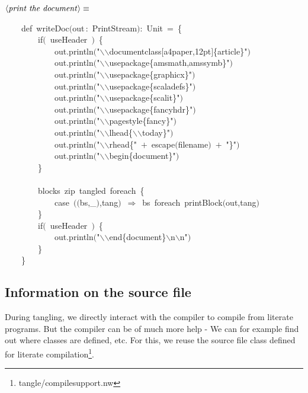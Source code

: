 \documentclass[a4paper,12pt]{article}
\begin{document}
$\left<\mbox{\emph{print the document}}\right>\equiv$
\begin{program}~~~~{\vem def}~writeDoc$($out\,{\rm :}~PrintStream$)${\rm :}~Unit~=~{\small\{}
\\~~~~~~~~{\vem if}$($~useHeader~$)$~{\small\{}
\\~~~~~~~~~~~~out.println$($"$\backslash$$\backslash$documentclass$[$a4paper,12pt$]${\small\{}article{\small\}}"$)$
\\~~~~~~~~~~~~out.println$($"$\backslash$$\backslash$usepackage{\small\{}amsmath,amssymb{\small\}}"$)$
\\~~~~~~~~~~~~out.println$($"$\backslash$$\backslash$usepackage{\small\{}graphicx{\small\}}"$)$
\\~~~~~~~~~~~~out.println$($"$\backslash$$\backslash$usepackage{\small\{}scaladefs{\small\}}"$)$
\\~~~~~~~~~~~~out.println$($"$\backslash$$\backslash$usepackage{\small\{}scalit{\small\}}"$)$
\\~~~~~~~~~~~~out.println$($"$\backslash$$\backslash$usepackage{\small\{}fancyhdr{\small\}}"$)$
\\~~~~~~~~~~~~out.println$($"$\backslash$$\backslash$pagestyle{\small\{}fancy{\small\}}"$)$
\\~~~~~~~~~~~~out.println$($"$\backslash$$\backslash$lhead{\small\{}$\backslash$$\backslash$today{\small\}}"$)$
\\~~~~~~~~~~~~out.println$($"$\backslash$$\backslash$rhead{\small\{}"~$+$~escape$($filename$)$~$+$~"{\small\}}"$)$
\\~~~~~~~~~~~~out.println$($"$\backslash$$\backslash$begin{\small\{}document{\small\}}"$)$
\\~~~~~~~~{\small\}}
\\~~~~~~~~
\\~~~~~~~~blocks~zip~tangled~foreach~{\small\{}
\\~~~~~~~~~~~~{\vem case}~$($$($bs,\_$)$,tang$)$~$\Rightarrow$~bs~foreach~printBlock$($out,tang$)$
\\~~~~~~~~{\small\}}
\\[0.5em]~~~~~~~~{\vem if}$($~useHeader~$)$~{\small\{}
\\~~~~~~~~~~~~out.println$($"$\backslash$$\backslash$end{\small\{}document{\small\}}$\backslash$n$\backslash$n"$)$
\\~~~~~~~~{\small\}}
\\~~~~{\small\}}
\\[0.5em]\end{program}
\subsection{Information on the source file}
During tangling, we directly interact with the compiler to compile from literate
programs. But the compiler can be of much more help - We can for example find
out where classes are defined, etc. For this, we reuse the source file class
defined for literate compilation\footnote{tangle/compilesupport.nw}.
\end{document}
